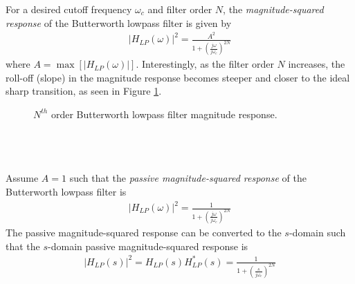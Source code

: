 \documentclass{report}
\begin{document}
\noindent For a desired cutoff frequency $\omega_c$ and filter order $N$, the \emph{magnitude-squared response} of the Butterworth lowpass filter is given by 
\begin{align}
    |H_{LP}(\omega)|^2 = \frac{A^2}{1+\left(\frac{j\omega}{j\omega_c}\right)^{2N}}
\end{align}
where $A=\max[|H_{LP}(\omega)|]$. Interestingly, as the filter order $N$ increases, the roll-off (slope) in the magnitude response 
becomes steeper and closer to the ideal sharp transition, as seen in Figure \ref{butt_resp}.
\begin{figure}[!hbt]
    \centering
    \caption{$N^{th}$ order Butterworth lowpass filter magnitude response.}
    \label{butt_resp}
\end{figure}
\\ \\ \\
Assume $A=1$ such that the \emph{passive magnitude-squared response} of the Butterworth lowpass filter is 
\begin{align}
    |H_{LP}(\omega)|^2 = \frac{1}{1+\left(\frac{j\omega}{j\omega_c}\right)^{2N}}
\end{align}
The passive magnitude-squared response can be converted to the $s$-domain such that 
the $s$-domain passive magnitude-squared response is
\begin{align}
    |H_{LP}(s)|^2 = H_{LP}(s)H_{LP}^*(s) = \frac{1}{1+\left(\frac{s}{j\omega_c}\right)^{2N}}
\end{align}
\end{document}
